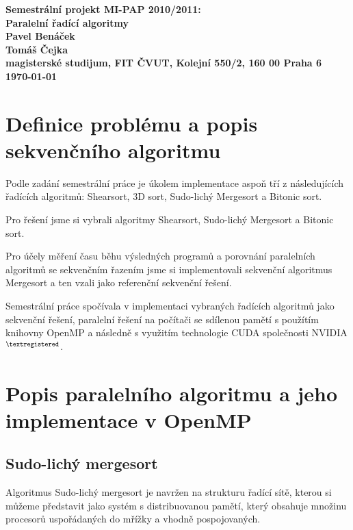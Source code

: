 \documentclass[12pt]{article}
\begin{document}

\begin{center}
\bf Semestrální projekt MI-PAP 2010/2011:\\[5mm]
    Paralelní řadící algoritmy\\[5mm]
    Pavel Benáček\\   
    Tomáš Čejka\\[2mm]
magisterské studijum, FIT ČVUT, Kolejní 550/2, 160 00 Praha 6\\[2mm]
\today
\end{center}

\section{Definice problému a popis sekvenčního algoritmu}
Podle zadání semestrální práce je úkolem implementace aspoň tří z následujících
řadících algoritmů: Shearsort, 3D sort, Sudo-lichý Mergesort a Bitonic sort.

Pro řešení jsme si vybrali algoritmy Shearsort, Sudo-lichý Mergesort a Bitonic sort.

Pro účely měření času běhu výsledných programů a porovnání paralelních algoritmů se sekvenčním
řazením jsme si implementovali sekvenční algoritmus Mergesort a ten vzali jako referenční sekvenční
řešení.

Semestrální práce spočívala v implementaci vybraných řadících algoritmů jako sekvenční řešení, paralelní
řešení na počítači se sdílenou pamětí s použítím knihovny OpenMP a následně s využitím technologie CUDA
společnosti NVIDIA$^{\tiny{\textregistered}}$.

\section{Popis paralelního algoritmu a jeho implementace v OpenMP}
\subsection{Sudo-lichý mergesort}
Algoritmus Sudo-lichý mergesort je navržen na strukturu řadící sítě, kterou si můžeme představit jako
systém s distribuovanou pamětí, který obsahuje množinu procesorů uspořádaných do mřížky a vhodně pospojovaných.
\end{document}
